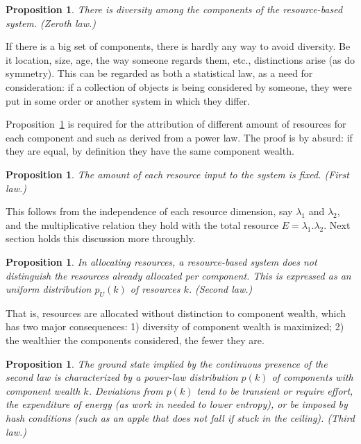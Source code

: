 \documentclass[a4paper, 11pt]{article} %
\newtheorem{proposition}[theorem]{Proposition}
\begin{document}
\begin{proposition}\label{prop:0}
	There is diversity among the components of the resource-based system. (Zeroth law.)
\end{proposition}

If there is a big set of components, there is hardly any way to avoid diversity. Be it location, size, age, the way someone regards them, etc., distinctions arise (as do symmetry). This can be regarded as both a statistical law, as a need for consideration: if a collection of objects is being considered by someone, they were put in some order or another system in which they differ.

Proposition~\ref{prop:0} is required for the attribution of different amount of resources for each component and such as derived from a power law. 
The proof is by absurd: if they are equal, by definition they have the same component wealth.

\begin{proposition}
	The amount of each resource input to the system is fixed. (First law.)
\end{proposition}

This follows from the independence of each resource dimension,
say $\lambda_1$ and $\lambda_2$, and
the multiplicative relation they hold with the total resource $E=\lambda_1 . \lambda_2$. Next section holds this discussion more throughly.

\begin{proposition}
	In allocating resources, a resource-based system does not distinguish the resources already allocated per component. This is expressed as an uniform distribution $p_U(k)$ of resources $k$. (Second law.)
\end{proposition}

That is, resources are allocated without distinction to component wealth, which has two major consequences: 1) diversity of component wealth is maximized; 2) the wealthier the components considered, the fewer they are. 

\begin{proposition}
	The ground state implied by the continuous presence of the second law is characterized by
	a power-law distribution $p(k)$ of components with component wealth $k$. Deviations from $p(k)$ tend to be transient or require effort, the expenditure of energy (as work in needed to lower entropy), or be imposed by hash conditions (such as an apple that does not fall if stuck in the ceiling). (Third law.)
\end{proposition}
\end{document}
